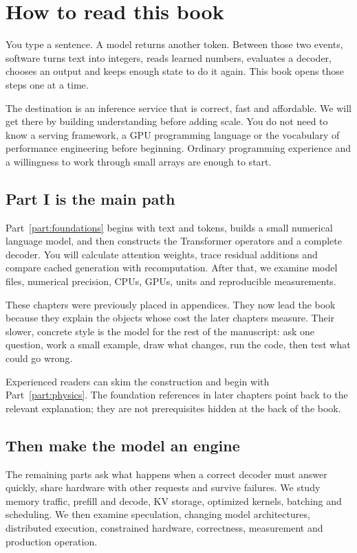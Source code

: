 \chapter*{How to read this book}

You type a sentence. A model returns another token. Between those two
events, software turns text into integers, reads learned numbers,
evaluates a decoder, chooses an output and keeps enough state to do it
again. This book opens those steps one at a time.

The destination is an inference service that is correct, fast and
affordable. We will get there by building understanding before adding
scale. You do not need to know a serving framework, a GPU programming
language or the vocabulary of performance engineering before beginning.
Ordinary programming experience and a willingness to work through
small arrays are enough to start.

\section*{Part I is the main path}
Part~\ref{part:foundations} begins with text and tokens, builds a small
numerical language model, and then constructs the Transformer operators
and a complete decoder. You will calculate attention weights, trace
residual additions and compare cached generation with recomputation.
After that, we examine model files, numerical precision, CPUs, GPUs,
units and reproducible measurements.

These chapters were previously placed in appendices. They now lead the
book because they explain the objects whose cost the later chapters
measure. Their slower, concrete style is the model for the rest of the
manuscript: ask one question, work a small example, draw what changes,
run the code, then test what could go wrong.

Experienced readers can skim the construction and begin with
Part~\ref{part:physics}. The foundation references in later chapters
point back to the relevant explanation; they are not prerequisites
hidden at the back of the book.

\section*{Then make the model an engine}
The remaining parts ask what happens when a correct decoder must
answer quickly, share hardware with other requests and survive failures.
We study memory traffic, prefill and decode, KV storage, optimized
kernels, batching and scheduling. We then examine speculation, changing
model architectures, distributed execution, constrained hardware,
correctness, measurement and production operation.

